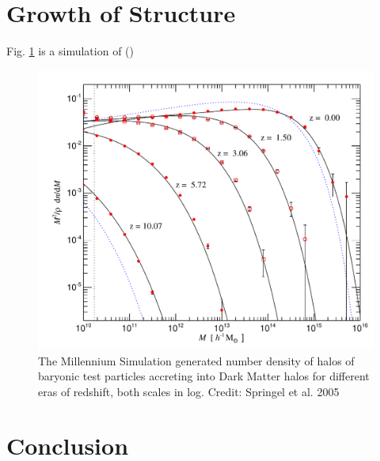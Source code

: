 \documentclass{paper}
\begin{document}
\section{Growth of Structure}

  Fig. \ref{fig:Struct-halo_accretion} is a simulation of %
  (\cite{2005Natur.435..629S})

  \begin{figure}[!htb]
    \begin{centering}
    \includegraphics[scale=0.6]{Struct-halo_accretion.pdf}
    \caption{The Millennium Simulation generated number density of halos of 
      baryonic test particles accreting into Dark Matter halos for different 
      eras of redshift, both scales in log. 
    Credit: Springel et al. 2005}
    \label{fig:Struct-halo_accretion}
    \end{centering}
  \end{figure}
  

\section{Conclusion}


\pagebreak
\begin{singlespace}
\printbibliography
\end{singlespace}

\end{document}
